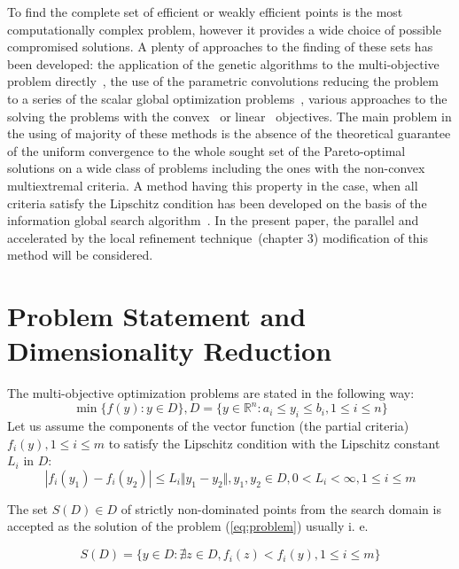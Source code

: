 \documentclass{llncs}
\begin{document}
To find the complete set of efficient or weakly efficient points is the most computationally
complex problem, however it provides a wide choice of possible compromised solutions. A
plenty of approaches to the finding of these sets has been developed: the application of the
genetic algorithms to the multi-objective problem directly~\cite{DebPratap2002}, the use of the
parametric convolutions reducing the problem to a series of the scalar global optimization
problems~\cite{GergelKozinov2017}, various approaches to the solving the problems with the
convex~\cite{ZhangZuo2013} or linear~\cite{Benson1998} objectives. The main problem in the
using of majority of these methods is the absence of the theoretical guarantee of the uniform
convergence to the whole sought set of the Pareto-optimal solutions on a wide class of
problems including the ones with the non-convex multiextremal criteria. A method having this
property in the case, when all criteria satisfy the Lipschitz condition has been developed on the
basis of the information global search algorithm~\cite{markinStrongin1993}. In the present
paper, the parallel and accelerated by the local refinement technique~\cite{strOptBook}(chapter
3) modification of this method will be considered.

\section{Problem Statement and Dimensionality Reduction}
The multi-objective optimization problems are stated in the following way:
\begin{equation}
  \label{eq:problem}
  \min\{f(y): y\in D\}, D=\{y\in \mathbb{R}^n: a_i \leqslant y_i \leqslant b_i, 1\leqslant i
\leqslant n \}
\end{equation}
Let us assume the components of the vector function (the partial criteria) \(f_i(y), 1\leqslant
i\leqslant m\) to satisfy the Lipschitz condition with the Lipschitz constant \(L_i\) in \(D\):
\begin{displaymath}
\label{lip}
|f_i(y_1)-f_i(y_2)|\leqslant L_i\Vert y_1-y_2\Vert,y_1,y_2\in D,0<L_i<\infty,1\leqslant i
\leqslant m
\end{displaymath}

The set \(S(D)\in D\) of strictly non-dominated points from the search domain is accepted as the
solution of the problem (\ref{eq:problem}) usually i. e.

\begin{equation}
  \label{eq:slater}
  S(D) = \{y\in D: \nexists z\in D, f_i(z)<f_i(y),1\leqslant i \leqslant m\}
\end{equation}
\end{document}
